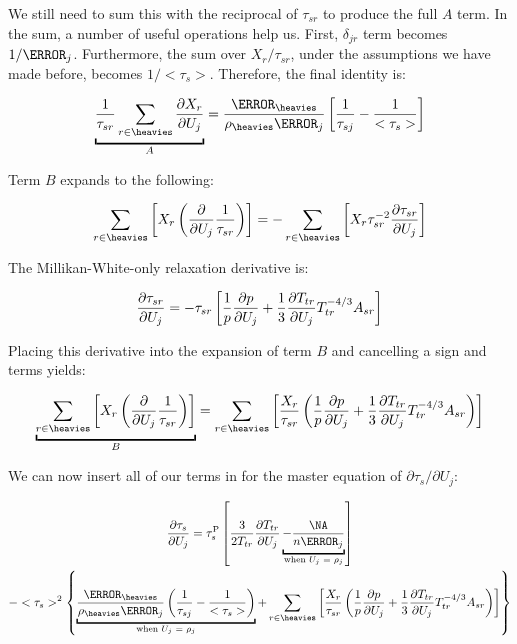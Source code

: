 \documentclass[10pt]{article}
\begin{document}
\begin{flushleft}
We still need to sum this with the reciprocal of $\tau_{sr}$ to produce the full $A$ term. In the sum, a number of useful operations help us. First, $\delta_{jr}$ term becomes $1 / \MW_j$. Furthermore, the sum over $X_r / \tau_{sr}$, under the assumptions we have made before, becomes $1 / <\tau_s>$. Therefore, the final identity is:

\begin{equation}
     \ub{\frac{1}{\tau_{sr}} \sum_{r \in \heavies} \pd{X_r}{U_j}}{A} = \frac{\MW_{\heavies}}{\rho_{\heavies} \MW_j} \bb{\frac{1}{\tau_{sj}}  - \frac{1}{<\tau_s>}}
\end{equation}

Term $B$ expands to the following:

\begin{equation}
    \sum_{r \in \heavies} \bb{X_r \bp{\pd{}{U_j} \frac{1}{\tau_{sr}}}} = - \sum_{r \in \heavies} \bb{X_r \tau_{sr}^{-2} \pd{\tau_{sr}}{U_j}}
\end{equation}

The Millikan-White-only relaxation derivative is:

\begin{equation}
    \frac{\partial \tau_{sr}}{\partial U_j} = -\tau_{sr} \left[ \frac{1}{p} \frac{\partial p}{\partial U_j} + \frac{1}{3} \frac{\partial T_{tr}}{\partial U_j} T_{tr}^{-4/3} A_{sr} \right]
\end{equation}

Placing this derivative into the expansion of term $B$ and cancelling a sign and terms yields:

\begin{equation*}
    \ub{\sum_{r \in \heavies} \bb{X_r \bp{\pd{}{U_j} \frac{1}{\tau_{sr}}}}}{B} =  \sum_{r \in \heavies} \bb{ \frac{X_r}{\tau_{sr}} \bp{\frac{1}{p} \pd{p}{U_j} + \frac{1}{3} \pd{T_{tr}}{U_j} T_{tr}^{-4/3} A_{sr} } }
\end{equation*}


We can now insert all of our terms in for the master equation of $\partial \tau_s / \partial U_j$:

\begin{multline}
    \pd{\tau_s}{U_j} = \tau_s^\text{P} \bb{\frac{3}{2 T_{tr}} \pd{T_{tr}}{U_j} \ub{- \frac{\NA}{n \MW_j}}{\text{when $U_j$ = $\rho_j$} } } 
    \\-<\tau_s>^2  \bcb {\underbracket{\frac{\MW_{\heavies}}{\rho_{\heavies} \MW_j} \bp{\frac{1}{\tau_{sj}}  - \frac{1}{<\tau_s>}}}_{\text{when $U_j$ = $\rho_j$}} + \sum_{r \in \heavies} \bb{ \frac{X_r}{\tau_{sr}} \bp{\frac{1}{p} \pd{p}{U_j} + \frac{1}{3} \pd{T_{tr}}{U_j} T_{tr}^{-4/3} A_{sr}}} }
\end{multline}


\end{flushleft}
\end{document}
